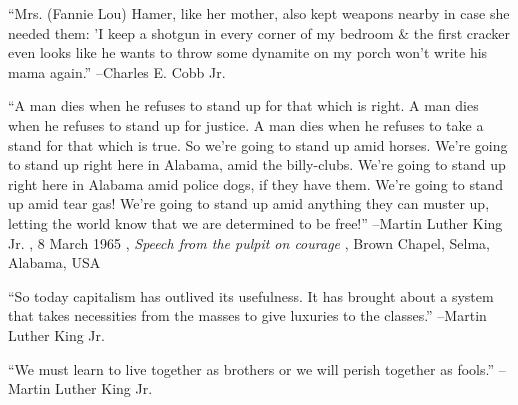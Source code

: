 \documentclass{article}%
\begin{document}
\begin{minipage}{\textwidth}%
\flushleft%
“Mrs. (Fannie Lou) Hamer, like her mother, also kept weapons nearby in case she needed them: 'I keep a shotgun in every corner of my bedroom \& the first cracker even looks like he wants to throw some dynamite on my porch won't write his mama again.”%
\linebreak%
\vspace{1mm}%
–Charles E. Cobb Jr.%
\linebreak%
\vspace{1mm}%
\end{minipage}%
\linebreak%
\vspace{1mm}%
\begin{minipage}{\textwidth}%
\flushleft%
“A man dies when he refuses to stand up for that which is right. A man dies when he refuses to stand up for justice. A man dies when he refuses to take a stand for that which is true. So we're going to stand up amid horses. We're going to stand up right here in Alabama, amid the billy{-}clubs. We're going to stand up right here in Alabama amid police dogs, if they have them. We're going to stand up amid tear gas! We're going to stand up amid anything they can muster up, letting the world know that we are determined to be free!”%
\linebreak%
\vspace{1mm}%
–Martin Luther King Jr.%
, 8 March 1965%
, \textit{Speech from the pulpit on courage}%
, Brown Chapel, Selma, Alabama, USA%
\linebreak%
\vspace{1mm}%
\end{minipage}%
\linebreak%
\vspace{1mm}%
\begin{minipage}{\textwidth}%
\flushleft%
“So today capitalism has outlived its usefulness. It has brought about a system that takes necessities from the masses to give luxuries to the classes.”%
\linebreak%
\vspace{1mm}%
–Martin Luther King Jr.%
\linebreak%
\vspace{1mm}%
\end{minipage}%
\linebreak%
\vspace{1mm}%
\begin{minipage}{\textwidth}%
\flushleft%
“We must learn to live together as brothers or we will perish together as fools.”%
\linebreak%
\vspace{1mm}%
–Martin Luther King Jr.%
\linebreak%
\vspace{1mm}%
\end{minipage}%
\end{document}

